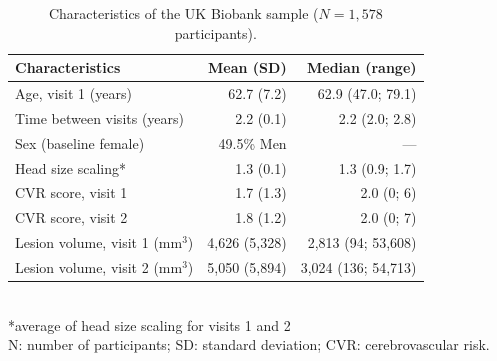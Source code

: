 \begin{table}[ht]
\centering
\renewcommand{\arraystretch}{1.05}
\caption{Characteristics of the UK Biobank sample ($N = 1{,}578$ participants).}
\begin{tabular}{ |l||r|r|}
\hline
	Characteristics & Mean (SD) & Median (range)\\
\hline
\hline
	Age, visit 1 (years) & 62.7 (7.2) & 62.9 (47.0; 79.1) \\
	Time between visits (years) & 2.2 (0.1) & 2.2 (2.0; 2.8) \\
	Sex (baseline female) & 49.5\% Men & --- \\
	Head size scaling* & 1.3 (0.1) & 1.3 (0.9; 1.7) \\
\hline
\hline
	CVR score, visit 1 & 1.7 (1.3) & 2.0 (0; 6) \\
	CVR score, visit 2 & 1.8 (1.2) & 2.0 (0; 7) \\
\hline
\hline
	Lesion volume, visit 1 (mm$^3$) & 4,626 (5,328) & 2,813 (94; 53,608) \\
	Lesion volume, visit 2  (mm$^3$) & 5,050 (5,894) & 3,024 (136; 54,713) \\
\hline
\end{tabular}
\\[0.5em]
*average of head size scaling for visits 1 and 2\\
N: number of participants; SD: standard deviation; CVR: cerebrovascular risk.
\label{tab:UKBdata}
\end{table}

